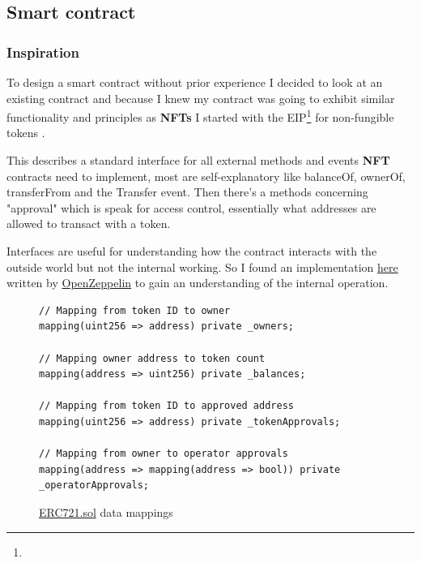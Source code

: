\subsection{Smart contract}

\subsubsection{Inspiration}

To design a smart contract without prior experience I decided to look at an existing contract and because I knew my contract was going to exhibit similar functionality and principles as \textbf{NFTs} I started with the EIP\footnote{} for non-fungible tokens \nft. 

This describes a standard interface for all external methods and events \textbf{NFT} contracts need to implement, most are self-explanatory like balanceOf, ownerOf, transferFrom and the Transfer event. Then there's a methods concerning "approval" which is  speak for access control, essentially what addresses are allowed to transact with a token.

Interfaces are useful for understanding how the contract interacts with the outside world but not the internal working. So I found an implementation \href{https://github.com/OpenZeppelin/openzeppelin-contracts/blob/master/contracts/token/ERC721/ERC721.sol}{here} written by \href{https://github.com/OpenZeppelin}{OpenZeppelin} to gain an understanding of the internal operation.

\begin{figure}[H]
\caption{\href{https://github.com/OpenZeppelin/openzeppelin-contracts/blob/master/contracts/token/ERC721/ERC721.sol}{ERC721.sol} data mappings}
\centering
\begin{lstlisting}[language=Solidity]
// Mapping from token ID to owner 
mapping(uint256 => address) private _owners;

// Mapping owner address to token count
mapping(address => uint256) private _balances;

// Mapping from token ID to approved address
mapping(uint256 => address) private _tokenApprovals;

// Mapping from owner to operator approvals
mapping(address => mapping(address => bool)) private _operatorApprovals;
\end{lstlisting}
\end{figure}

